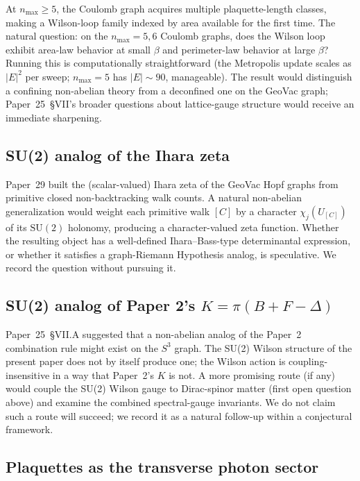 \documentclass[11pt]{article}
\begin{document}
At $n_{\max} \geq 5$, the Coulomb graph acquires multiple plaquette-length
classes, making a Wilson-loop family indexed by area available for
the first time.  The natural question: on the $n_{\max} = 5, 6$
Coulomb graphs, does the Wilson loop exhibit area-law behavior at
small $\beta$ and perimeter-law behavior at large $\beta$?  Running
this is computationally straightforward (the Metropolis update scales
as $|E|^2$ per sweep; $n_{\max} = 5$ has $|E| \sim 90$, manageable).
The result would distinguish a confining non-abelian theory from a
deconfined one on the GeoVac graph; Paper~25~\S VII's broader
questions about lattice-gauge structure would receive an immediate
sharpening.

\subsection{SU(2) analog of the Ihara zeta}

Paper~29 built the (scalar-valued) Ihara zeta of the GeoVac Hopf
graphs from primitive closed non-backtracking walk counts.  A natural
non-abelian generalization would weight each primitive walk $[C]$ by
a character $\chi_j(U_{[C]})$ of its $\mathrm{SU}(2)$ holonomy,
producing a character-valued zeta function.  Whether the resulting
object has a well-defined Ihara--Bass-type determinantal expression,
or whether it satisfies a graph-Riemann Hypothesis analog, is
speculative.  We record the question without pursuing it.

\subsection{SU(2) analog of Paper 2's $K = \pi(B + F - \Delta)$}

Paper~25~\S VII.A suggested that a non-abelian analog of the Paper~2
combination rule might exist on the $S^3$ graph.  The SU(2) Wilson
structure of the present paper does not by itself produce one; the
Wilson action is coupling-insensitive in a way that Paper~2's $K$ is
not.  A more promising route (if any) would couple the SU(2) Wilson
gauge to Dirac-spinor matter (first open question above) and examine
the combined spectral-gauge invariants.  We do not claim such a route
will succeed; we record it as a natural follow-up within a
conjectural framework.

\subsection{Plaquettes as the transverse photon sector}
\end{document}
